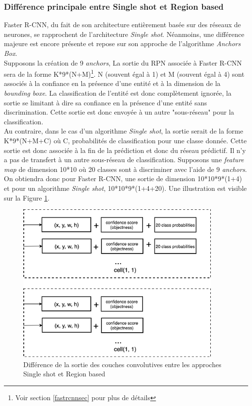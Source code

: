
\subsubsection{Différence principale entre Single shot et Region based}
Faster R-CNN, du fait de son architecture entièrement basée sur des réseaux de neurones, se rapprochent de l'architecture \textit{Single shot}. Néanmoins, une différence majeure est encore présente et repose sur son approche de l'algorithme \textit{Anchors Box}.\\

\noindent Supposons la création de 9 \textit{anchors}, La sortie du RPN associée à Faster R-CNN sera de la forme K*9*(N+M)\footnote{Voir section \ref{fastrcnnsec} pour plus de détails}. N (souvent égal à 1) et M (souvent égal à 4) sont associés à la confiance en la présence d'une entité et à la dimension de la \textit{bounding boxe}. La classification de l'entité est donc complètement ignorée, la sortie se limitant à dire sa confiance en la présence d'une entité sans discrimination. Cette sortie est donc envoyée à un autre "sous-réseau" pour la classification.\\

\noindent Au contraire, dans le cas d'un algorithme \textit{Single shot}, la sortie serait de la forme K*9*(N+M+C) où C, probabilités de classification pour une classe donnée. Cette sortie est donc associée à la fin de la prédiction et donc du réseau prédictif. Il n'y a pas de transfert à un autre sous-réseau de classification. Supposons une \textit{feature map} de dimension 10*10 où 20 classes sont à discriminer avec l'aide de 9 \textit{anchors}. On obtiendra donc pour Faster R-CNN, une sortie de dimension 10*10*9*(1+4) et pour un algorithme \textit{Single shot}, 10*10*9*(1+4+20). Une illustration est visible sur la Figure \ref{singleshot}.\\

\begin{figure}
    \centering
    \includegraphics[scale=0.6]{./tex/computer-vision/sota/singleshot.png}
    \caption{Différence de la sortie des couches convolutives entre les approches Single shot et Region based}
    \label{singleshot}
\end{figure}

